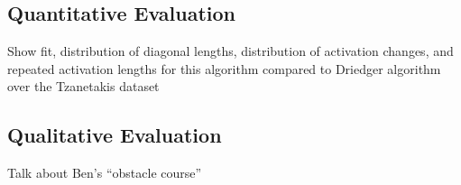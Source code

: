 \documentclass{article}
\begin{document}
\subsection{Quantitative Evaluation}
Show fit, distribution of diagonal lengths, distribution of activation changes, and repeated activation lengths for this algorithm compared to Driedger algorithm over the Tzanetakis dataset


\subsection{Qualitative Evaluation}

Talk about Ben's ``obstacle course''



%
%
%
%
%
\end{document}
